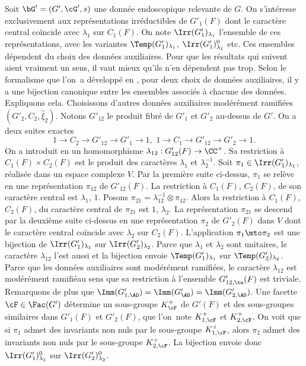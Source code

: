 Soit $\bG'=(G',\cG',s)$ une donnée endoscopique relevante de $G$. On s'intéresse exclusivement aux représentations irréductibles de $G'_{1}(F)$ dont le caractère central coïncide avec $\lambda_{1}$ sur $C_{1}(F)$. On note $\Irr(G'_{1})_{\lambda_{1}}$ l'ensemble de ces représentations, avec les variantes $\Temp(G'_{1})_{\lambda_{1}}$, $\Irr(G'_{1})^0_{\lambda_{1}}$ etc. Ces ensembles dépendent du choix des données auxiliaires. Pour que les résultats qui suivent aient vraiment un sens, il vaut mieux qu'ils n'en dépendent pas trop. Selon le formalisme que l'on~a développé en \cite{MW}, pour deux choix de données auxiliaires, il y a une bijection canonique entre les ensembles associés à chacune des données. Expliquons cela.
Choisissons d'autres données auxiliaires modérément ramifiées $(G'_{2},C_{2},\hat{\xi}_{2})$. Notons $G'_{12}$ le produit fibré de $G'_{1}$ et $G'_{2}$ au-dessus de $G'$. On a deux suites exactes
\[
1\to C_{2}\to G'_{12}\to G'_{1}\to 1,\,\,1\to C_{1}\to G'_{12}\to G'_{2}\to 1.
\]
On a introduit en \cite[I.2.5]{MW} un homomorphisme $\lambda_{12}:G'_{12}(F)\to \CC^{\times}$. Sa restriction à $C_{1}(F)\times C_{2}(F)$ est le produit des caractères $\lambda_{1}$ et $\lambda_{2}^{-1}$. Soit $\pi_{1}\in \Irr(G'_{1})_{\lambda_{1}}$, réalisée dans un espace complexe $V$. Par la première suite ci-dessus, $\pi_{1}$ se relève en une représentation $\pi_{12}$ de $G'_{12}(F)$. La restriction à $C_{1}(F)$, \resp $C_{2}(F)$, de son carac\-tère central est $\lambda_{1}$, \resp $1$. Posons $\pi_{21}=\lambda_{12}^{-1}\otimes \pi_{12}$. Alors la restriction à $C_{1}(F)$, \resp $C_{2}(F)$, du caractère central de $\pi_{21}$ est $1$, \resp $\lambda_{2}$. La représentation $\pi_{21}$ se descend par la deuxième suite ci-dessus en une représentation $\pi_{2}$ de $G'_{2}(F)$ dans $V$ dont le caractère central coïncide avec $\lambda_{2}$ sur $C_{2}(F)$. L'application $\pi_{1}\mto \pi_{2}$ est une bijection de $\Irr(G'_{1})_{\lambda_{1}}$ sur $\Irr(G'_{2})_{\lambda_{2}}$. Parce que $\lambda_{1}$ et $\lambda_{2}$ sont unitaires, le caractère $\lambda_{12}$ l'est aussi et la bijection envoie $\Temp(G'_{1})_{\lambda_{1}}$ sur $\Temp(G'_{2})_{\lambda_{2}}$. Parce que les données auxiliaires sont modérément ramifiées, le caractère $\lambda_{12}$ est \og modérément ramifié\fg au sens que sa restriction à l'ensemble $G'_{12,\tu}(F)$ est triviale. Remarquons de plus que $\Imm(G'_{1,\AD})=\Imm(G'_{\AD})=\Imm(G'_{2,\AD})$. Une facette $\cF\in \Fac(G')$ détermine un sous-groupe $K_{\cF}^+$ de $G'(F)$ et des sous-groupes similaires dans $G'_{1}(F)$ et $G'_{2}(F)$, que l'on~note $K_{1,\cF}^+$ et $K_{2,\cF}^+$. On voit que si $\pi_{1}$ admet des invariants non nuls par le sous-groupe $K_{1,\cF}^{+}$, alors $\pi_{2}$ admet des invariants non nuls par le sous-groupe $K_{2,\cF}^{+}$. La bijection envoie donc $\Irr(G'_{1})^0_{\lambda_{1}}$ sur $\Irr(G'_{2})^0_{\lambda_{2}}$.

